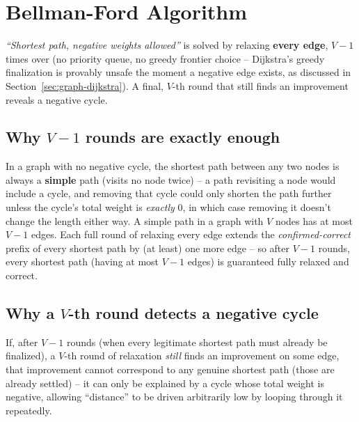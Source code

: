 \section{Bellman-Ford Algorithm}
\label{sec:graph-bellman-ford}


\begin{patternbox}
\emph{``Shortest path, negative weights allowed''} is solved by
relaxing \textbf{every edge}, $V{-}1$ times over (no priority queue, no
greedy frontier choice -- Dijkstra's greedy finalization is provably
unsafe the moment a negative edge exists, as discussed in
Section~\ref{sec:graph-dijkstra}). A final, $V$-th round that still
finds an improvement reveals a negative cycle.
\end{patternbox}

\subsection*{Why $V-1$ rounds are exactly enough}

In a graph with no negative cycle, the shortest path between any two
nodes is always a \textbf{simple} path (visits no node twice) -- a path
revisiting a node would include a cycle, and removing that cycle could
only shorten the path further unless the cycle's total weight is
\emph{exactly} $0$, in which case removing it doesn't change the
length either way. A simple path in a graph with $V$ nodes has at most
$V{-}1$ edges. Each full round of relaxing every edge extends the
\emph{confirmed-correct} prefix of every shortest path by (at least)
one more edge -- so after $V{-}1$ rounds, every shortest path (having
at most $V{-}1$ edges) is guaranteed fully relaxed and correct.

\subsection*{Why a $V$-th round detects a negative cycle}

If, after $V{-}1$ rounds (when every legitimate shortest path must
already be finalized), a $V$-th round of relaxation \emph{still} finds
an improvement on some edge, that improvement cannot correspond to any
genuine shortest path (those are already settled) -- it can only be
explained by a cycle whose total weight is negative, allowing
``distance'' to be driven arbitrarily low by looping through it
repeatedly.

